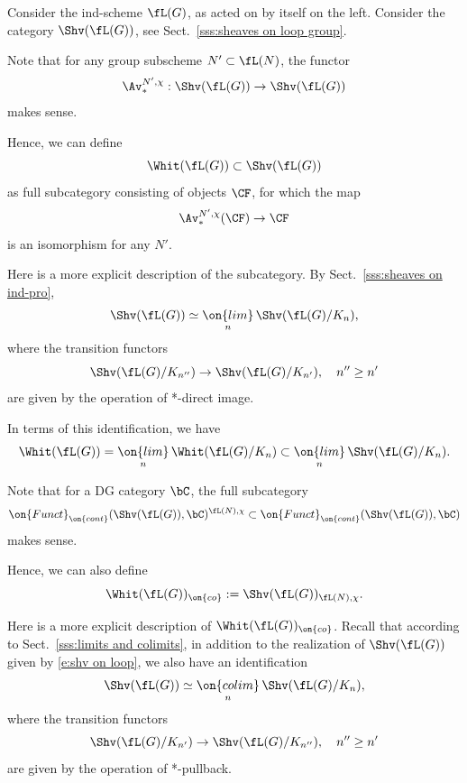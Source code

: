 \documentclass[9pt]{amsart}
\theoremstyle{definition}
\theoremstyle{remark}
\newcommand{\secref}[1]{Sect.~\ref{#1}}
\numberwithin{equation}{section}
\begin{document}
\sssec{}

Consider the ind-scheme $\fL(G)$, as acted on by itself on the left. Consider
the category $\Shv(\fL(G))$, see \secref{sss:sheaves on loop group}.

\medskip

Note that for any group subscheme $N'\subset \fL(N)$, the functor
$$\Av_*^{N',\chi}:\Shv(\fL(G))\to \Shv(\fL(G))$$
makes sense. 

\medskip

Hence, we can define 
$$\Whit(\fL(G))\subset \Shv(\fL(G))$$
as full subcategory consisting of objects $\CF$, for which the map
$$\Av_*^{N',\chi}(\CF)\to \CF$$
is an isomorphism for any $N'$. 

\sssec{}

Here is a more explicit description of the subcategory. By \secref{sss:sheaves on ind-pro}, 
\begin{equation} \label{e:shv on loop}
\Shv(\fL(G))\simeq \underset{n}{\on{lim}}\, \Shv(\fL(G)/K_n),
\end{equation}
where the transition functors 
\begin{equation} \label{e:* pushforward}
\Shv(\fL(G)/K_{n''})\to \Shv(\fL(G)/K_{n'}), \quad n''\geq n'
\end{equation}
are given by the operation of *-direct image. 

\medskip

In terms of this identification, we have
\begin{equation} \label{e:* Whit as limit}
\Whit(\fL(G))=\underset{n}{\on{lim}}\, \Whit(\fL(G)/K_n)\subset \underset{n}{\on{lim}}\, \Shv(\fL(G)/K_n).
\end{equation} 

\sssec{}

Note that for a DG category $\bC$, the full subcategory
$$\on{Funct}_{\on{cont}}(\Shv(\fL(G)),\bC)^{\fL(N),\chi}\subset \on{Funct}_{\on{cont}}(\Shv(\fL(G)),\bC)$$
makes sense. 

\medskip

Hence, we can also define 
$$\Whit(\fL(G))_{\on{co}}:=\Shv(\fL(G))_{\fL(N),\chi}.$$

\sssec{}

Here is a more explicit description of $\Whit(\fL(G))_{\on{co}}$. Recall that according to \secref{sss:limits and colimits},
in addition to the realization of $\Shv(\fL(G))$ given by \eqref{e:shv on loop}, we also have an identification
\begin{equation} \label{e:shv on loop colim}
\Shv(\fL(G))\simeq \underset{n}{\on{colim}}\, \Shv(\fL(G)/K_n),
\end{equation}
where the transition functors 
\begin{equation} \label{e:* pullback}
\Shv(\fL(G)/K_{n'})\to \Shv(\fL(G)/K_{n''}), \quad n''\geq n'
\end{equation} 
are given by the operation of *-pullback.
\end{document}
